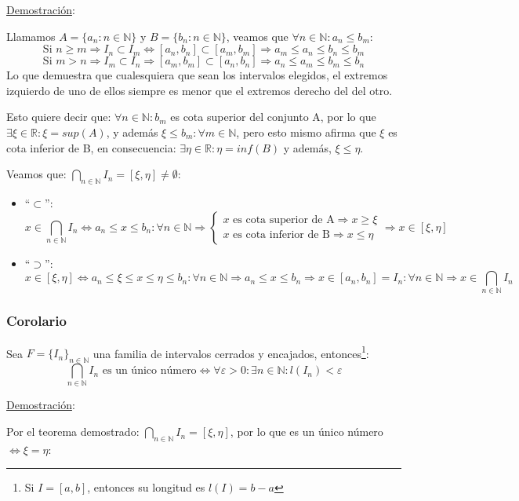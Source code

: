 \documentclass[10pt,a4paper,openright]{book}
\theoremstyle{break}
\begin{document}
\underline{Demostración}:\par
Llamamos $A=\{a_n: n\in \mathbb N\}$ y $B=\{b_n: n\in \mathbb N\}$, veamos que $\forall n\in \mathbb N: a_n\leq b_m$:
$$\mbox{Si }n\geq m\Rightarrow I_n\subset I_m\Leftrightarrow [a_n,b_n]\subset [a_m, b_m]\Rightarrow a_m\leq a_n\leq b_n\leq b_m$$
$$\mbox{Si }m>n\Rightarrow I_m\subset I_n\Rightarrow [a_m,b_m]\subset[a_n,b_n]\Rightarrow a_n\leq a_m\leq b_m\leq b_n$$
Lo que demuestra que cualesquiera que sean los intervalos elegidos, el extremos izquierdo de uno de ellos siempre es menor que el extremos derecho del del otro.\par 
Esto quiere decir que: $\forall n\in \mathbb N: b_m$ es cota superior del conjunto A, por lo que $\exists \xi\in \mathbb R: \xi=sup (A)$, y además $\xi\leq b_m :\forall m\in \mathbb N$, pero esto mismo afirma que $\xi$ es cota inferior de B, en consecuencia: $\exists \eta\in \mathbb R: \eta=inf(B)$ y además, $\xi\leq\eta$.\par
Veamos que: $\bigcap_{n\in \mathbb N}I_n=[\xi, \eta]\neq \emptyset$:
\begin{itemize}
\item ``$\subset$'':
$$x\in \bigcap_{n\in \mathbb N}I_n\Leftrightarrow a_n\leq x\leq b_n: \forall n \in \mathbb N\Rightarrow\begin{cases} x \mbox{ es cota superior de A}\Rightarrow x\geq\xi \\
x\mbox{ es cota inferior de B}\Rightarrow x\leq \eta\end{cases}\Rightarrow x\in [\xi,\eta]$$

\item ``$\supset$'':
$$x\in [\xi,\eta]\Leftrightarrow a_n\leq \xi\leq x\leq \eta\leq b_n: \forall n \in \mathbb N\Rightarrow a_n\leq x\leq b_n\Rightarrow x\in [a_n,b_n]=I_n: \forall n\in \mathbb N\Rightarrow x\in \bigcap_{n\in \mathbb N}I_n$$
\end{itemize}

\subsubsection{Corolario}
Sea $F=\{I_n\}_{n\in \mathbb N}$ una familia de intervalos cerrados y encajados, entonces\footnote{Si $I=[a,b]$, entonces su longitud es $l(I)=b-a$}:
$$\bigcap_{n\in \mathbb N}I_n\mbox{ es un único número}\Leftrightarrow \forall \varepsilon>0: \exists n\in \mathbb N: l(I_n)<\varepsilon$$

\underline{Demostración}:\par
Por el teorema demostrado: $\bigcap_{n\in \mathbb N}I_n=[\xi,\eta]$, por lo que es un único número $\Leftrightarrow \xi=\eta$:
\end{document}
